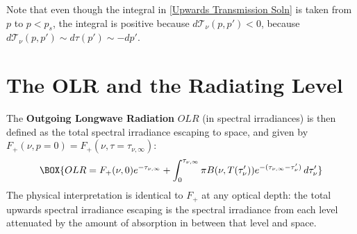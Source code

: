 Note that even though the integral in \ref{Upwards Transmission Soln} is taken from $p$ to $p<p_s$, the integral is positive because $d\mathcal{T}_\nu(p,p')<0$, because $d\mathcal{T}_\nu(p,p')\sim d\tau(p')\sim - dp'$.

\section{The \texorpdfstring{OLR}{OLR} and the Radiating Level}

The \textbf{Outgoing Longwave Radiation} $OLR$ (in spectral irradiances) is then defined as the total spectral irradiance escaping to space, and given by $F_+(\nu,p=0)=F_+(\nu,\tau=\tau_{\nu,\infty})$:
\begin{align}
    \BOX{OLR=F_+(\nu,0)e^{-\tau_{\nu,\infty}}+\int_0^{\tau_{\nu,\infty}}\pi B(\nu,T(\tau_\nu'))e^{-(\tau_{\nu,\infty}-\tau_\nu')}\,d\tau_\nu'} \label{OLR Soln}
\end{align}
The physical interpretation is identical to $F_+$ at any optical depth: the total upwards spectral irradiance escaping is the spectral irradiance from each level attenuated by the amount of absorption in between that level and space.

